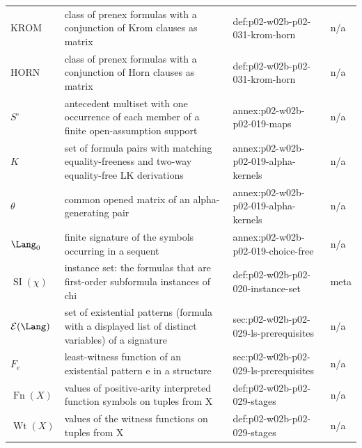 \begin{longtable}{@{}p{}p{}p{}p{}@{}}
\(\mathrm{KROM}\) & class of prenex formulas with a conjunction of Krom clauses as matrix & def:\allowbreak{}p02-\allowbreak{}w02b-\allowbreak{}p02-\allowbreak{}031-\allowbreak{}krom-\allowbreak{}horn & n/a \\
\(\mathrm{HORN}\) & class of prenex formulas with a conjunction of Horn clauses as matrix & def:\allowbreak{}p02-\allowbreak{}w02b-\allowbreak{}p02-\allowbreak{}031-\allowbreak{}krom-\allowbreak{}horn & n/a \\
\(S^{\circ}\) & antecedent multiset with one occurrence of each member of a finite open-assumption support & annex:\allowbreak{}p02-\allowbreak{}w02b-\allowbreak{}p02-\allowbreak{}019-\allowbreak{}maps & n/a \\
\(K\) & set of formula pairs with matching equality-freeness and two-way equality-free LK derivations & annex:\allowbreak{}p02-\allowbreak{}w02b-\allowbreak{}p02-\allowbreak{}019-\allowbreak{}alpha-\allowbreak{}kernels & n/a \\
\(\theta\) & common opened matrix of an alpha-generating pair & annex:\allowbreak{}p02-\allowbreak{}w02b-\allowbreak{}p02-\allowbreak{}019-\allowbreak{}alpha-\allowbreak{}kernels & n/a \\
\(\Lang_0\) & finite signature of the symbols occurring in a sequent & annex:\allowbreak{}p02-\allowbreak{}w02b-\allowbreak{}p02-\allowbreak{}019-\allowbreak{}choice-\allowbreak{}free & n/a \\
\(\operatorname{SI}(\chi)\) & instance set: the formulas that are first-order subformula instances of chi & def:\allowbreak{}p02-\allowbreak{}w02b-\allowbreak{}p02-\allowbreak{}020-\allowbreak{}instance-\allowbreak{}set & meta \\
\(\mathcal E(\Lang)\) & set of existential patterns (formula with a displayed list of distinct variables) of a signature & sec:\allowbreak{}p02-\allowbreak{}w02b-\allowbreak{}p02-\allowbreak{}029-\allowbreak{}ls-\allowbreak{}prerequisites & n/a \\
\(F_e\) & least-witness function of an existential pattern e in a structure & sec:\allowbreak{}p02-\allowbreak{}w02b-\allowbreak{}p02-\allowbreak{}029-\allowbreak{}ls-\allowbreak{}prerequisites & n/a \\
\(\operatorname{Fn}(X)\) & values of positive-arity interpreted function symbols on tuples from X & def:\allowbreak{}p02-\allowbreak{}w02b-\allowbreak{}p02-\allowbreak{}029-\allowbreak{}stages & n/a \\
\(\operatorname{Wt}(X)\) & values of the witness functions on tuples from X & def:\allowbreak{}p02-\allowbreak{}w02b-\allowbreak{}p02-\allowbreak{}029-\allowbreak{}stages & n/a \\

\end{longtable}

